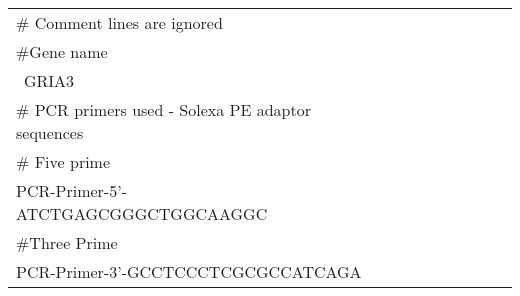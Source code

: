 \footnotesize
  \begin{tabular}{lcccccccc}
  \# Comment lines are ignored\\
  \#Gene name\\
  ~GRIA3\\
  \# PCR primers used - Solexa PE adaptor sequences\\
  \# Five prime\\
  PCR-Primer-5'-ATCTGAGCGGGCTGGCAAGGC\\
  \#Three Prime\\
  PCR-Primer-3'-GCCTCCCTCGCGCCATCAGA\\
  \end{tabular}
